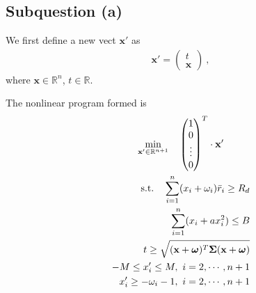 \documentclass[12pt]{ftec2101}
\newcommand{\vect}[1]{\mathbf{#1}}
\begin{document}
\subsection{Subquestion (a)}
We first define a new vect $\vect{x'}$ as
\begin{align*}
    \vect{x'} = 
    \begin{pmatrix}
        t \\
        \vect{x}
    \end{pmatrix}\ , 
\end{align*}
where $\vect{x} \in \mathbb{R}^n$, $t \in \mathbb{R}$.

\noindent
The nonlinear program formed is 
\begin{gather}
    \min_{\vect{x'} \in \mathbb{R}^{n+1}} \quad
    \begin{pmatrix}
        1 \\
        0 \\
        \vdots \\
        0
    \end{pmatrix}^T
    \cdot \vect{x'}\\
\begin{aligned}
    \textup{s.t.} \quad \sum_{i=1}^{n} (x_i + \omega_i)\bar{r}_i \geq R_d \\
                        \sum_{i=1}^{n} (x_i + a x_i^2) \leq B \\
                        t \geq \sqrt{(\vect{x}+\boldsymbol{\omega})^T \boldsymbol{\Sigma} (\vect{x}+\boldsymbol{\omega})} \\
                        -M \leq x'_i \leq M,\ i=2,\cdots,n+1 \\
                        x'_i \geq - \omega_i - 1,\ i=2,\cdots,n+1
\end{aligned}
\label{nonlinear:constraint}
\end{gather}
\end{document}
